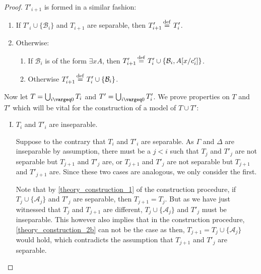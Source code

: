 \begin{proof}
	\noindent
	$T'_{i+1}$ is formed in a similar fashion:
	\begin{enumerate}[~~(1$'$)]
		\item
			If $T'_{i} \cup \{\mathcal{B}_i\}$ and $T_{i+1}$ are separable, then $T'_{i+1} \defeq{}\, T'_i$.
		\item
			\begin{samepage}
				Otherwise: 
			\begin{enumerate}[~(2$'$a)]
				\item If $\mathcal{B}_i$ is of the form $\exists x A$, then $T'_{i+1} \defeq{}\, T'_i \cup \{ \mathcal{B}_i, A\subst{x/c'_i} \}$.
				\item Otherwise $T'_{i+1} \defeq{}\, T'_i \cup \{ \mathcal{B}_i \}$.
			\end{enumerate}
			\end{samepage}
	\end{enumerate}

	Now let
	$T = \bigcup_{i\vargeq 0} T_i$
	and
	$T' = \bigcup_{i\vargeq 0} T'_i$.
	We prove properties on $T$ and $T'$ which will be vital for the construction of a model of $T\cup T'$:

	\begin{enumerate}[I.]
		\item
			\label{enum:theories_insep}
			$T_i$ and $T'_i$ are inseparable.

			Suppose to the contrary that $T_i$ and $T'_i$ are separable.
			As $\Gamma$ and $\Delta$ are inseparable by assumption,
			there must be a $j<i$ such that $T_{j}$ and $T'_{j}$ are not separable but $T_{j+1}$ and $T'_{j}$ are,
			or $T_{j+1}$ and $T'_{j}$ are not separable but $T_{j+1}$ and $T'_{j+1}$ are.
			Since these two cases are analogous, we only consider the first. 

			Note that by \ref{theory_construction_1} of the construction procedure, if $T_{j} \cup \{ \mathcal{A}_{j} \}$ and $T'_{j}$ are separable, then $T_{j+1} = T_{j}$. 
			But as we have just witnessed that $T_{j}$ and $T_{j+1}$ are different, $T_{j} \cup \{ \mathcal{A}_{j} \}$ and $T'_{j}$ must be inseparable.
			This however also implies that in the construction procedure, \ref{theory_construction_2b} can not be the case as then, $T_{j+1} = T_{j} \cup \{ \mathcal{A}_{j} \}$ would hold, which contradicts the assumption that $T_{j+1}$ and $T'_j$ are separable.


\end{enumerate}
\end{proof}

